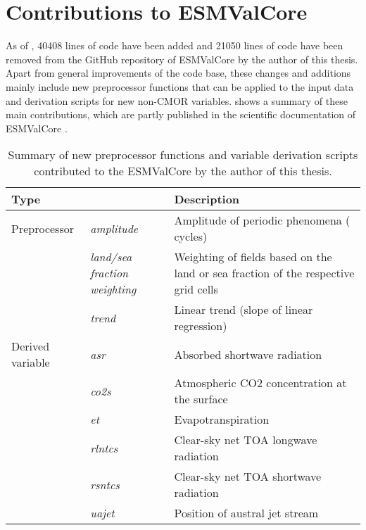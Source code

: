 \section{Contributions to \acs{ESMValCore}}
\label{sec:03:contributions_to_esmvalcore}

As of \TheMonth{}, 40408 lines of code have been added and 21050 lines of code
have been removed from the GitHub repository of \ac{ESMValCore} by the author
of this thesis. Apart from general improvements of the code base, these changes
and additions mainly include new preprocessor functions that can be applied to
the input data and derivation scripts for new non-\ac{CMOR} variables.
 shows a summary of these main
contributions, which are partly published in the scientific documentation of
\ac{ESMValCore} \autocite{Righi2020}.

\begin{table}[!b]
  \centering
  \begin{tabulary}{\columnwidth}{L >{\em}L L}
    \toprule
    Type &  & Description \\
    \midrule
    Preprocessor & amplitude & Amplitude of periodic phenomena (\eg{} cycles)
    \\
    \cmidrule(l){2-3}
    & land/sea fraction weighting & Weighting of fields based on the land or
    sea fraction of the respective grid cells \\
    \cmidrule(l){2-3}
    & trend & Linear trend (slope of linear regression) \\
    \midrule
    Derived variable & asr & Absorbed shortwave radiation \\
    \cmidrule(l){2-3}
    & co2s & Atmospheric \acs{CO2} concentration at the surface \\
    \cmidrule(l){2-3}
    & et & Evapotranspiration \\
    \cmidrule(l){2-3}
    & rlntcs & Clear-sky net \acf{TOA} longwave radiation \\
    \cmidrule(l){2-3}
    & rsntcs & Clear-sky net \acs{TOA} shortwave radiation \\
    \cmidrule(l){2-3}
    & uajet & Position of austral jet stream \\
    \bottomrule
  \end{tabulary}
  \caption[
    Summary of new preprocessor functions and variable derivation scripts
    contributed to the \acf{ESMValCore} by the author of this thesis.
  ]{
    Summary of new preprocessor functions and variable derivation scripts
    contributed to the \acf{ESMValCore} by the author of this thesis.
  }
  \label{tab:03:changes_to_esmvalcore}
\end{table}

